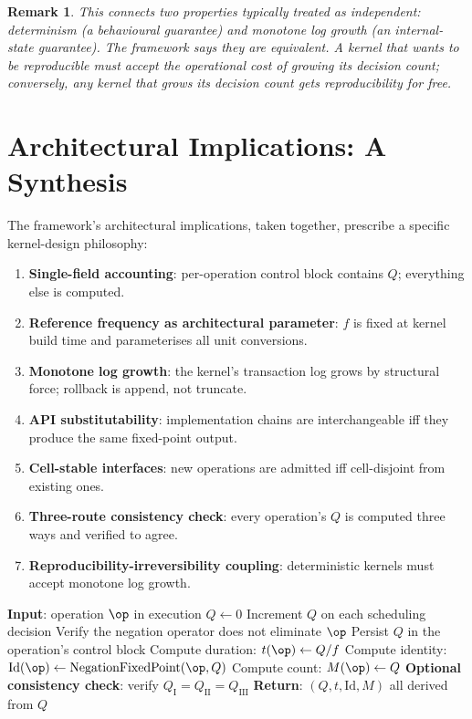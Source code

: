 \documentclass[twocolumn,11pt,a4paper]{article}
\newtheorem{remark}[theorem]{Remark}
\newcommand{\Mcount}{M}
\newcommand{\Qweight}{Q}
\begin{document}
\begin{remark}
This connects two properties typically treated as independent: determinism (a behavioural guarantee) and monotone log growth (an internal-state guarantee). The framework says they are equivalent. A kernel that wants to be reproducible must accept the operational cost of growing its decision count; conversely, any kernel that grows its decision count gets reproducibility for free.
\end{remark}

\section{Architectural Implications: A Synthesis}
\label{sec:architecture}

The framework's architectural implications, taken together, prescribe a specific kernel-design philosophy:

\begin{enumerate}[nosep,leftmargin=*]
\item \textbf{Single-field accounting}: per-operation control block contains $\Qweight$; everything else is computed.
\item \textbf{Reference frequency as architectural parameter}: $f$ is fixed at kernel build time and parameterises all unit conversions.
\item \textbf{Monotone log growth}: the kernel's transaction log grows by structural force; rollback is append, not truncate.
\item \textbf{API substitutability}: implementation chains are interchangeable iff they produce the same fixed-point output.
\item \textbf{Cell-stable interfaces}: new operations are admitted iff cell-disjoint from existing ones.
\item \textbf{Three-route consistency check}: every operation's $\Qweight$ is computed three ways and verified to agree.
\item \textbf{Reproducibility-irreversibility coupling}: deterministic kernels must accept monotone log growth.
\end{enumerate}

\begin{algorithm}[!htbp]
\caption{Single-field operation completion}
\label{alg:single-field}
\begin{algorithmic}[1]
\State \textbf{Input}: operation $\op$ in execution
\State $\Qweight \gets 0$
  \State Increment $\Qweight$ on each scheduling decision
  \State Verify the negation operator does not eliminate $\op$
\EndWhile
\State Persist $\Qweight$ in the operation's control block
\State Compute duration: $t(\op) \gets \Qweight / f$
\State Compute identity: $\mathrm{Id}(\op) \gets \mathrm{NegationFixedPoint}(\op, \Qweight)$
\State Compute count: $\Mcount(\op) \gets \Qweight$
\State \textbf{Optional consistency check}: verify $\Qweight_\mathrm{I} = \Qweight_\mathrm{II} = \Qweight_\mathrm{III}$
\State \textbf{Return}: $(\Qweight, t, \mathrm{Id}, \Mcount)$ all derived from $\Qweight$
\end{algorithmic}
\end{algorithm}
\end{document}
